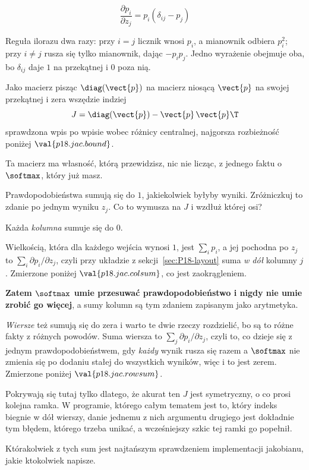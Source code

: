 \begin{fr}
\begin{ansblock}
\[ \frac{\partial p_i}{\partial z_j} = p_i(\delta_{ij} - p_j) \]
\end{ansblock}

Reguła ilorazu dwa razy: przy $i = j$ licznik wnosi $p_i$, a mianownik
odbiera $p_i^{2}$; przy $i \neq j$ rusza się tylko mianownik, dając
$-p_i p_j$. Jedno wyrażenie obejmuje oba, bo $\delta_{ij}$ daje $1$ na
przekątnej i $0$ poza nią.

Jako macierz \dash{} pisząc $\diag(\vect{p})$ na macierz niosącą
$\vect{p}$ na swojej przekątnej i zera wszędzie indziej \dash{}
\[ J = \diag(\vect{p}) - \vect{p}\,\vect{p}\T \]
sprawdzona wpis po wpisie wobec różnicy centralnej, najgorsza rozbieżność
poniżej $\val{p18.jac.bound}$.
\end{fr}

\begin{fr}
Ta macierz ma własność, którą przewidzisz, nic nie licząc, z jednego faktu o
$\softmax$, który już masz.

Prawdopodobieństwa sumują się do $1$, jakiekolwiek byłyby wyniki.
Zróżniczkuj to zdanie po jednym wyniku $z_j$. Co to wymusza na $J$ \dash{} i
wzdłuż której osi?
\dotline
\nextframe
\end{fr}

\begin{fr}
\begin{ansblock}
Każda \emph{kolumna} sumuje się do $0$.
\end{ansblock}

Wielkością, która dla każdego wejścia wynosi $1$, jest $\sum_i p_i$, a jej
pochodna po $z_j$ to $\sum_i \partial p_i/\partial z_j$, czyli \dash{} przy
układzie z sekcji~\ref{sec:P18-layout} \dash{} suma \emph{w dół} kolumny $j$.
Zmierzone poniżej $\val{p18.jac.colsum}$, co jest zaokrągleniem.

\textbf{Zatem $\softmax$ umie przesuwać prawdopodobieństwo i nigdy nie umie
zrobić go więcej}, a sumy kolumn są tym zdaniem zapisanym jako arytmetyka.

\begin{note}
\emph{Wiersze} też sumują się do zera i warto te dwie rzeczy rozdzielić, bo są
to różne fakty z różnych powodów. Suma wiersza to
$\sum_j \partial p_i/\partial z_j$, czyli to, co dzieje się z jednym
prawdopodobieństwem, gdy \emph{każdy} wynik rusza się razem \dash{} a
$\softmax$ nie zmienia się po dodaniu stałej do wszystkich wyników, więc i to
jest zerem. Zmierzone poniżej $\val{p18.jac.rowsum}$.

Pokrywają się tutaj tylko dlatego, że akurat ten $J$ jest symetryczny, o co
prosi kolejna ramka. W programie, którego całym tematem jest to, który indeks
biegnie w dół wierszy, danie jednemu z nich argumentu drugiego jest dokładnie
tym błędem, którego trzeba unikać, a wcześniejszy szkic tej ramki go popełnił.
\end{note}

Którakolwiek z tych sum jest najtańszym sprawdzeniem implementacji jakobianu,
jakie ktokolwiek napisze.
\end{fr}

